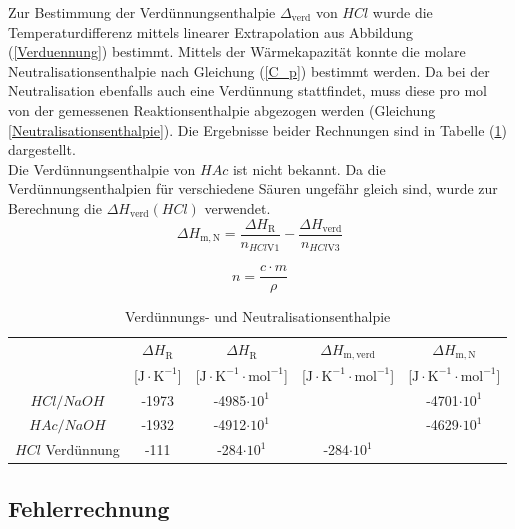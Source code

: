 \documentclass[12pt,a4paper,titlepage,headinclude,bibtotoc]{scrartcl}
\begin{document}
Zur Bestimmung der Verdünnungsenthalpie $\Delta_\mathrm{verd}$ von $HCl$ wurde die Temperaturdifferenz mittels linearer Extrapolation aus Abbildung (\ref{Verduennung}) bestimmt. Mittels der Wärmekapazität konnte die molare Neutralisationsenthalpie nach Gleichung (\ref{C_p}) bestimmt werden. Da bei der Neutralisation ebenfalls auch eine Verdünnung stattfindet, muss diese pro mol von der gemessenen Reaktionsenthalpie abgezogen werden (Gleichung \ref{Neutralisationsenthalpie}). Die Ergebnisse beider Rechnungen sind in Tabelle (\ref{TabelleVerdNeutr}) dargestellt.\\
Die Verdünnungsenthalpie von $HAc$ ist nicht bekannt. Da die Verdünnungsenthalpien für verschiedene Säuren ungefähr gleich sind, wurde zur Berechnung die $\Delta H_\mathrm{verd}(HCl)$ verwendet.\\

\begin{equation}\label{Neutralisationsenthalpie}
\Delta H_\mathrm{m, N}= \frac{\Delta H_\mathrm{R}}{n_{HCl \mathrm{V1}}}- \frac{\Delta H_\mathrm{verd}}{n_{HCl \mathrm{V3}}} 
\end{equation}

\begin{equation}\label{n}
n=\frac{c \cdot m}{\rho}
\end{equation}

\begin{table} \caption{Verdünnungs- und Neutralisationsenthalpie}
\label{TabelleVerdNeutr} 
\begin{tabular}{c|c|c|c|c}
& $\Delta H_\mathrm{R}$ &  $\Delta H_\mathrm{R}$  & $\Delta H_\mathrm{m, verd}$  &$\Delta H_\mathrm{m, N}$ \\
&[$\mathrm{J}\cdot \mathrm{K}^{-1}$]&[$\mathrm{J}\cdot \mathrm{K}^{-1} \cdot \mathrm{mol}^{-1}$]&[$\mathrm{J}\cdot \mathrm{K}^{-1} \cdot \mathrm{mol}^{-1}$]&[$\mathrm{J}\cdot \mathrm{K}^{-1} \cdot \mathrm{mol}^{-1}$]\\
\hline
$HCl/NaOH$&-1973&-4985$\cdot 10^1$&&-4701$\cdot 10^1$\\
$HAc/NaOH$&-1932&-4912$\cdot 10^1$&& -4629$\cdot 10^1$\\
$HCl$ Verdünnung&-111&-284$\cdot 10^1$&-284$\cdot 10^1$&\\
\end{tabular} 
\end{table}



\subsection{Fehlerrechnung}
\end{document}
